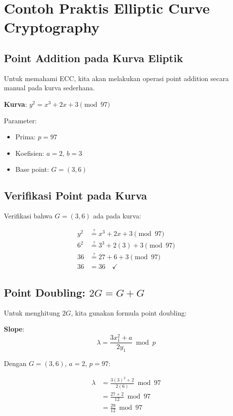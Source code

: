 ﻿\section{Contoh Praktis Elliptic Curve Cryptography}

\subsection{Point Addition pada Kurva Eliptik}

Untuk memahami ECC, kita akan melakukan operasi point addition secara manual pada kurva sederhana.

\textbf{Kurva}: $y^2 = x^3 + 2x + 3 \pmod{97}$

Parameter:
\begin{itemize}
  \item Prima: $p = 97$
  \item Koefisien: $a = 2$, $b = 3$
  \item Base point: $G = (3, 6)$
\end{itemize}

\subsection{Verifikasi Point pada Kurva}

Verifikasi bahwa $G = (3, 6)$ ada pada kurva:

\begin{align*}
y^2 &\stackrel{?}{=} x^3 + 2x + 3 \pmod{97} \\
6^2 &\stackrel{?}{=} 3^3 + 2(3) + 3 \pmod{97} \\
36 &\stackrel{?}{=} 27 + 6 + 3 \pmod{97} \\
36 &= 36 \quad \checkmark
\end{align*}

\subsection{Point Doubling: \texorpdfstring{$2G = G + G$}{2G = G + G}}

Untuk menghitung $2G$, kita gunakan formula point doubling:

\textbf{Slope}:
\[
\lambda = \frac{3x_1^2 + a}{2y_1} \bmod p
\]

Dengan $G = (3, 6)$, $a = 2$, $p = 97$:

\begin{align*}
\lambda &= \frac{3(3)^2 + 2}{2(6)} \bmod 97 \\
        &= \frac{27 + 2}{12} \bmod 97 \\
        &= \frac{29}{12} \bmod 97
\end{align*}


